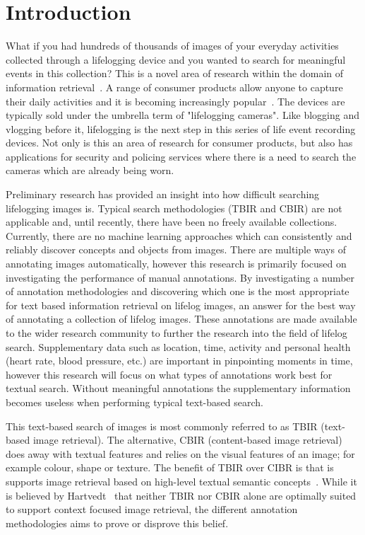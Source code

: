 \chapter{Introduction}

What if you had hundreds of thousands of images of your everyday activities collected through a lifelogging device and you wanted to search for meaningful events in this collection? This is a novel area of research within the domain of information retrieval~\cite{gurrin2014lifelogging}. A range of consumer products allow anyone to capture their daily activities and it is becoming increasingly popular~\cite{gurrin2014lifelogging}\cite{van2014future}\cite{askoxylakis2011log}. The devices are typically sold under the umbrella term of "lifelogging cameras". Like blogging and vlogging before it, lifelogging is the next step in this series of life event recording devices. Not only is this an area of research for consumer products, but also has applications for security and policing services where there is a need to search the cameras which are already being worn.

Preliminary research has provided an insight into how difficult searching lifelogging images is. Typical search methodologies (TBIR and CBIR) are not applicable and, until recently, there have been no freely available collections. Currently, there are no machine learning approaches which can consistently and reliably discover concepts and objects from images. There are multiple ways of annotating images automatically, however this research is primarily focused on investigating the performance of manual annotations. By investigating a number of annotation methodologies and discovering which one is the most appropriate for text based information retrieval on lifelog images, an answer for the best way of annotating a collection of lifelog images. These annotations are made available to the wider research community to further the research into the field of lifelog search. Supplementary data such as location, time, activity and personal health (heart rate, blood pressure, etc.) are important in pinpointing moments in time, however this research will focus on what types of annotations work best for textual search. Without meaningful annotations the supplementary information becomes useless when performing typical text-based search.

This text-based search of images is most commonly referred to as TBIR (text-based image retrieval). The alternative, CBIR (content-based image retrieval) does away with textual features and relies on the visual features of an image; for example colour, shape or texture. The benefit of TBIR over CIBR is that is supports image retrieval based on high-level textual semantic concepts~\cite{hartvedt2010using}. While it is believed by Hartvedt~\cite{hartvedt2010using} that neither TBIR nor CBIR alone are optimally suited to support context focused image retrieval, the different annotation methodologies aims to prove or disprove this belief.

